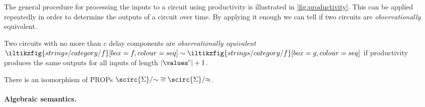 \documentclass[10pt]{article}
\begin{document}
The general procedure for processing the inputs to a circuit using productivity
is illustrated in \cref{fig:productivity}.
This can be applied repeatedly in order to determine the outputs of a
circuit over time.
By applying it enough we can tell if two circuits are \emph{observationally}
equivalent.

\begin{definition}
    Two circuits with no more than \(c\) delay components are
    \emph{observationally equivalent} \(
    \iltikzfig{strings/category/f}[box=f,colour=seq]
    \sim
    \iltikzfig{strings/category/f}[box=g,colour=seq]
    \) if productivity produces the same outputs for all inputs of length
    \(|\values^c|+1\).
\end{definition}

\begin{corollary}
    There is an isomorphism of PROPs
    \(\scirc{\Sigma} / {\sim} \cong \scirc{\Sigma} / {\approx}\).
\end{corollary}

\paragraph*{Algebraic semantics.}
\end{document}
